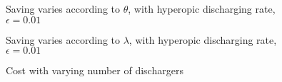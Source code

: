 \documentclass{article}
\begin{document}
\begin{figure}
\begin{center}

\caption{Saving varies according to $\theta$, with hyperopic discharging rate,  $\epsilon=0.01$}
\end{center}
\end{figure}


\begin{figure}
\begin{center}

\caption{Saving varies according to $\lambda$, with hyperopic discharging rate,  $\epsilon=0.01$}
\end{center}
\end{figure}

\begin{figure}
\begin{center}

\caption{Cost with varying number of dischargers}
\end{center}
\end{figure}
\end{document}
